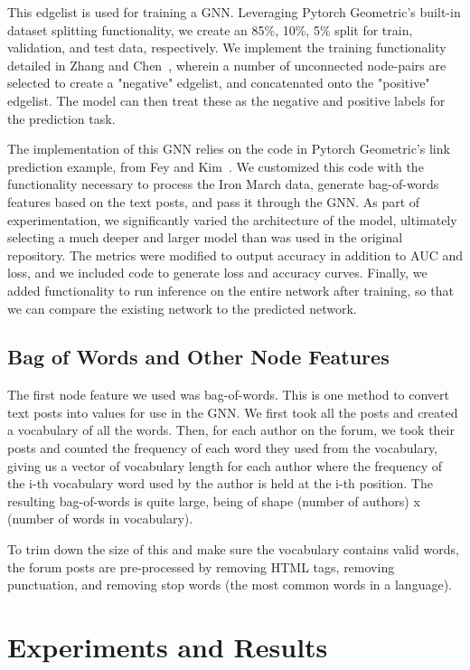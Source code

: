 \documentclass[10pt,twocolumn,letterpaper]{article}
\begin{document}
This edgelist is used for training a GNN. Leveraging Pytorch Geometric's built-in dataset splitting functionality, we create an 85\%, 10\%, 5\% split for train, validation, and test data, respectively. We implement the training functionality detailed in Zhang and Chen~\cite{SEAL}, wherein a number of unconnected node-pairs are selected to create a "negative" edgelist, and concatenated onto the "positive" edgelist. The model can then treat these as the negative and positive labels for the prediction task. 

The implementation of this GNN relies on the code in Pytorch Geometric's link prediction example, from Fey and Kim~\cite{pytorch-geometric}. We customized this code with the functionality necessary to process the Iron March data, generate bag-of-words features based on the text posts, and pass it through the GNN. As part of experimentation, we significantly varied the architecture of the model, ultimately selecting a much deeper and larger model than was used in the original repository. The metrics were modified to output accuracy in addition to AUC and loss, and we included code to generate loss and accuracy curves. Finally, we added functionality to run inference on the entire network after training, so that we can compare the existing network to the predicted network.

\subsection{Bag of Words and Other Node Features}

The first node feature we used was bag-of-words. This is one method to convert text posts into values for use in the GNN. We first took all the posts and created a vocabulary of all the words. Then, for each author on the forum, we took their posts and counted the frequency of each word they used from the vocabulary, giving us a vector of vocabulary length for each author where the frequency of the i-th vocabulary word used by the author is held at the i-th position. The resulting bag-of-words is quite large, being of shape (number of authors) x (number of words in vocabulary). 

To trim down the size of this and make sure the vocabulary contains valid words, the forum posts are pre-processed by removing HTML tags, removing punctuation, and removing stop words (the most common words in a language).

\section{Experiments and Results}
\end{document}
